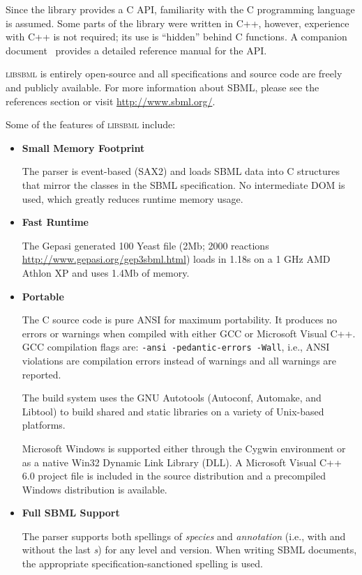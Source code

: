 \documentclass{sbmlmanual}
\newcommand{\libsbml}{\textsc{libsbml}}
\begin{document}
Since the library provides a C API, familiarity with the C programming
language is assumed.  Some parts of the library were written in C++,
however, experience with C++ is not required; its use is ``hidden''
behind C functions.  A companion document~\citep{bornstein:2003b} provides
a detailed reference manual for the API.

\libsbml{} is entirely open-source and all specifications and
source code are freely and publicly available.  For more information
about SBML, please see the references section or visit
\url{http://www.sbml.org/}.

Some of the features of \textsc{libsbml} include:


\begin{itemize}

  \item \textbf{Small Memory Footprint}

  The parser is event-based (SAX2) and loads SBML data into C
  structures that mirror the classes in the SBML specification.  No
  intermediate DOM is used, which greatly reduces runtime memory
  usage.

  \item \textbf{Fast Runtime}

  The Gepasi generated 100 Yeast file (2Mb; 2000 reactions
  \url{http://www.gepasi.org/gep3sbml.html}) loads in 1.18s on a 1 GHz
  AMD Athlon XP and uses 1.4Mb of memory.

  \item \textbf{Portable}

  The C source code is pure ANSI for maximum portability.  It produces
  no errors or warnings when compiled with either GCC or Microsoft
  Visual C++.  GCC compilation flags are: \texttt{-ansi
  -pedantic-errors -Wall}, i.e., ANSI violations are compilation errors
  instead of warnings and all warnings are reported.

  The build system uses the GNU Autotools (Autoconf, Automake, and
  Libtool) to build shared and static libraries on a variety of
  Unix-based platforms.

  Microsoft Windows is supported either through the Cygwin environment
  or as a native Win32 Dynamic Link Library (DLL).  A Microsoft Visual
  C++ 6.0 project file is included in the source distribution and a
  precompiled Windows distribution is available.

  \item \textbf{Full SBML Support}

  The parser supports both spellings of \emph{species} and
  \emph{annotation} (i.e., with and without the last \emph{s}) for any
  level and version.  When writing SBML documents, the appropriate
  specification-sanctioned spelling is used.


\end{itemize}
\end{document}
